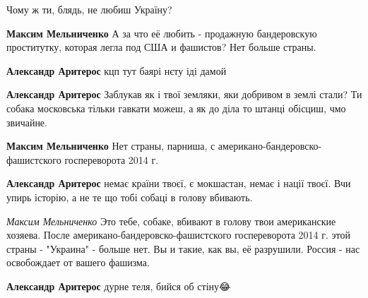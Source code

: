 \begin{itemize}
Чому ж ти, блядь, не любиш Україну?

\begin{itemize}

\textbf{Максим Мельниченко} А за что её любить - продажную бандеровскую проститутку, которая легла под США и фашистов?
Нет больше страны.


\textbf{Александр Аритерос} кцп тут баярі нєту іді дамой


\textbf{Александр Аритерос} Заблукав як і твої земляки, яки добривом в землі стали? Ти собака московська тільки гавкати можеш, а як до діла то штанці обісциш, чмо звичайне.


\textbf{Максим Мельниченко} Нет страны, парниша, с американо-бандеровско-фашистского госпереворота 2014 г.


\textbf{Александр Аритерос} немає країни твоєї, є мокшастан, немає і нації твоєї. Вчи упирь історію, а не те що тобі собаці в голову вбивають.


\emph{Максим Мельниченко} Это тебе, собаке, вбивают в голову твои американские хозяева.
После американо-бандеровско-фашистского госпереворота 2014 г. этой страны - "Украина" - больше нет. Вы и такие, как вы, её разрушили.
Россия - нас освобождает от вашего фашизма.


\textbf{Александр Аритерос} дурне теля, бийся об стіну😂



\end{itemize}
\end{itemize}
